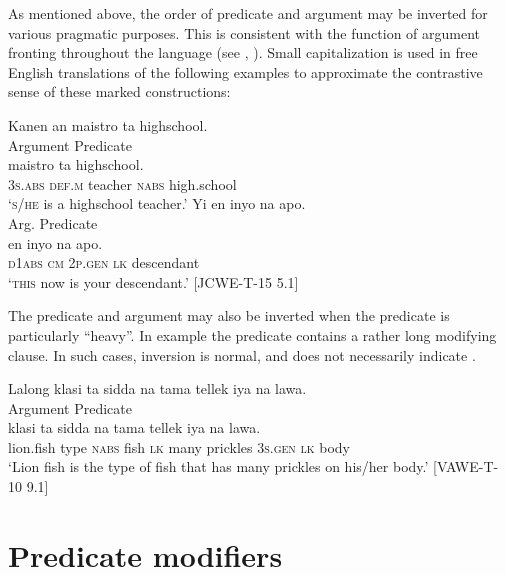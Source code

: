 As mentioned above, the order of predicate and argument may be inverted for various pragmatic purposes. This is consistent with the function of argument fronting throughout the language (see , ). Small capitalization is used in free English translations of the following examples to approximate the contrastive sense of these marked constructions:

\newpage
\ea
Kanen  an  maistro  ta  highschool. \\\smallskip
\hspace{.2cm}Argument\hspace{.8cm}  Predicate \\
\gll [ Kanen  an{ }] maistro  ta  highschool. \\
{} 3\textsc{s.abs}  \textsc{def.m}  teacher  \textsc{nabs}  high.school \\
\glt ‘\textsc{s/he} is a highschool teacher.’
\z
\ea
Yi  en  inyo  na  apo. \\\smallskip
\hspace{.2cm}Arg.\hspace{.6cm}  Predicate \\
\gll [{ }Yi{ }]  en  inyo  na  apo. \\
\textsc{d1abs}   \textsc{cm}  2\textsc{p.gen}  \textsc{lk}  descendant \\
\glt ‘\textsc{this} now is your descendant.’ [JCWE-T-15 5.1]
\z

The predicate and argument may also be inverted when the predicate is particularly “heavy”. In example  the predicate contains a rather long modifying clause. In such cases, inversion is normal, and does not necessarily indicate . 

\ea
\label{bkm:Ref442262389}
Lalong  klasi  ta  sidda  na  tama  tellek  iya  na  lawa. \\\smallskip
\hspace{.1cm}Argument  Predicate \\
\gll [ Lalong{ }] klasi  ta  sidda  na  tama  tellek  iya  na  lawa. \\
{} lion.fish type  \textsc{nabs}  fish  \textsc{lk}  many  prickles  3\textsc{s.gen}  \textsc{lk}  body \\
\glt ‘Lion fish is the type of fish that has many prickles on his/her body.’ [VAWE-T-10 9.1]
\z

\section{Predicate modifiers}
\label{bkm:Ref444443349}\label{sec:predicatemodifiers}

